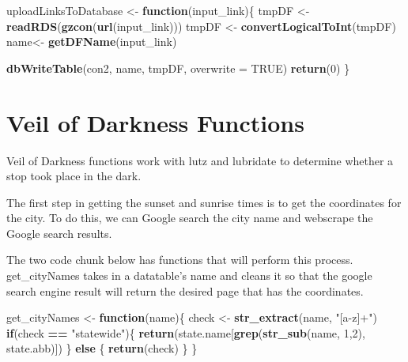 \documentclass[
]{book}
\newenvironment{Shaded}{\begin{snugshade}}{\end{snugshade}}
\newcommand{\ControlFlowTok}[1]{\textcolor[rgb]{0.13,0.29,0.53}{\textbf{#1}}}
\newcommand{\DataTypeTok}[1]{\textcolor[rgb]{0.13,0.29,0.53}{#1}}
\newcommand{\DecValTok}[1]{\textcolor[rgb]{0.00,0.00,0.81}{#1}}
\newcommand{\KeywordTok}[1]{\textcolor[rgb]{0.13,0.29,0.53}{\textbf{#1}}}
\newcommand{\NormalTok}[1]{#1}
\newcommand{\OperatorTok}[1]{\textcolor[rgb]{0.81,0.36,0.00}{\textbf{#1}}}
\newcommand{\OtherTok}[1]{\textcolor[rgb]{0.56,0.35,0.01}{#1}}
\newcommand{\StringTok}[1]{\textcolor[rgb]{0.31,0.60,0.02}{#1}}
\begin{document}
\begin{Shaded}
\begin{Highlighting}[]
\NormalTok{uploadLinksToDatabase <-}\StringTok{ }\ControlFlowTok{function}\NormalTok{(input_link)\{}
\NormalTok{  tmpDF <-}\StringTok{ }\KeywordTok{readRDS}\NormalTok{(}\KeywordTok{gzcon}\NormalTok{(}\KeywordTok{url}\NormalTok{(input_link)))}
\NormalTok{  tmpDF <-}\StringTok{ }\KeywordTok{convertLogicalToInt}\NormalTok{(tmpDF)}
\NormalTok{  name<-}\StringTok{ }\KeywordTok{getDFName}\NormalTok{(input_link)}
  
  \KeywordTok{dbWriteTable}\NormalTok{(con2, name, tmpDF, }\DataTypeTok{overwrite =} \OtherTok{TRUE}\NormalTok{)}
  \KeywordTok{return}\NormalTok{(}\DecValTok{0}\NormalTok{)}
\NormalTok{\}}
\end{Highlighting}
\end{Shaded}

\hypertarget{veil-of-darkness-functions}{%
\section{Veil of Darkness Functions}\label{veil-of-darkness-functions}}

Veil of Darkness functions work with lutz and lubridate to determine whether a stop took place in the dark.

The first step in getting the sunset and sunrise times is to get the coordinates for the city. To do this, we can Google search the city name and webscrape the Google search results.

The two code chunk below has functions that will perform this process. get\_cityNames takes in a datatable's name and cleans it so that the google search engine result will return the desired page that has the coordinates.

\begin{Shaded}
\begin{Highlighting}[]
\NormalTok{get_cityNames <-}\StringTok{ }\ControlFlowTok{function}\NormalTok{(name)\{}
\NormalTok{  check <-}\StringTok{ }\KeywordTok{str_extract}\NormalTok{(name, }\StringTok{"[a-z]+"}\NormalTok{)}
  \ControlFlowTok{if}\NormalTok{(check }\OperatorTok{==}\StringTok{ "statewide"}\NormalTok{)\{}
    \KeywordTok{return}\NormalTok{(state.name[}\KeywordTok{grep}\NormalTok{(}\KeywordTok{str_sub}\NormalTok{(name, }\DecValTok{1}\NormalTok{,}\DecValTok{2}\NormalTok{), state.abb)])}
\NormalTok{  \} }\ControlFlowTok{else}\NormalTok{ \{}
    \KeywordTok{return}\NormalTok{(check)}
\NormalTok{  \}}
\NormalTok{\}}
\end{Highlighting}
\end{Shaded}
\end{document}
